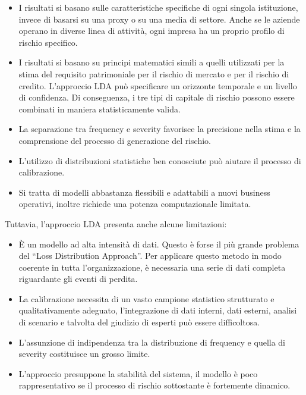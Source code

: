 \documentclass[titlepage]{article}
\begin{document}
\begin{itemize}
\begin{itemize}
	\item 	I risultati si basano sulle caratteristiche specifiche di ogni singola istituzione, invece di basarsi su una proxy o su una media di settore. Anche se le aziende operano in diverse linea di attività, ogni impresa ha un proprio profilo di rischio specifico.  
	\item 	I risultati si basano su principi matematici simili a quelli utilizzati per la stima del requisito patrimoniale per il rischio di mercato e per il rischio di credito. L'approccio LDA può specificare un orizzonte temporale e un livello di confidenza. Di conseguenza, i tre tipi di capitale di rischio possono essere combinati in maniera statisticamente valida.  
	\item 	La separazione tra frequency e severity favorisce la precisione nella stima e la comprensione del processo di generazione del rischio.  
	\item 	L’utilizzo di distribuzioni statistiche ben conosciute può aiutare il processo di calibrazione.  
	\item 	Si tratta di modelli abbastanza flessibili e adattabili a nuovi business operativi, inoltre richiede una potenza computazionale limitata.
\end{itemize}
	 Tuttavia, l'approccio LDA presenta anche alcune limitazioni: 
	\begin{itemize}
	\item 	È un modello ad alta intensità di dati. Questo è forse il più grande problema del “Loss Distribution Approach”. Per applicare questo metodo in modo coerente in tutta l'organizzazione, è necessaria una serie di dati completa riguardante gli eventi di perdita.  
	\item La calibrazione necessita di un vasto campione statistico strutturato e qualitativamente adeguato, l’integrazione di dati interni, dati esterni, analisi di scenario e talvolta del giudizio di esperti può essere difficoltosa.  
	\item 	L’assunzione di indipendenza tra la distribuzione di frequency e quella di severity costituisce un grosso limite.  
	\item 	L’approccio presuppone la stabilità del sistema, il modello è poco rappresentativo se il processo di rischio sottostante è fortemente dinamico. 
\end{itemize}


\end{itemize}
\end{document}

